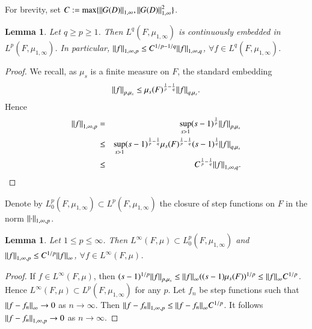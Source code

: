 \documentclass[final,1p]{elsarticle}
\numberwithin{equation}{section}
\theoremstyle{plain}
\newtheorem{lemma}[thm]{Lemma}
\theoremstyle{definition}
\begin{document}
For brevity, set $C := \max \{ {\mbox{\ensuremath{\| {G(D)} \|}}}_{1,\infty} ,  {\mbox{\ensuremath{\| {G(D)} \|}}}_{1,\infty}^2 \}$.

\begin{lemma} \label{lemma:cont_embed}
Let $q \geq p \geq 1$.  Then $L^q(F,\mu_{1,\infty})$ is continuously embedded in $L^p(F,\mu_{1,\infty})$.
In particular, ${\mbox{\ensuremath{\| {f} \|}}}_{1,\infty,p} \leq C^{1/p - 1/q} {\mbox{\ensuremath{\| {f} \|}}}_{1,\infty,q}$, ${\ensuremath{\forall}} f \in L^q(F,\mu_{1,\infty})$.
\end{lemma}
\begin{proof}
We recall, as $\mu_s$ is a finite measure on $F$, the standard embedding
$$
{\mbox{\ensuremath{\| {f} \|}}}_{p,\mu_s} \leq \mu_s(F)^{\frac 1p - \frac 1q} {\mbox{\ensuremath{\| {f} \|}}}_{q,\mu_s} .
$$
Hence
\begin{eqnarray*}
{\mbox{\ensuremath{\| {f} \|}}}_{1,\infty,p} & = & \sup_{s > 1} (s-1)^{ \frac 1p } {\mbox{\ensuremath{\| {f} \|}}}_{p,\mu_s} \\
& \leq & \sup_{s > 1} (s-1)^{\frac 1p - \frac 1q} \mu_s(F)^{\frac 1p - \frac 1q} (s-1)^{\frac 1q} {\mbox{\ensuremath{\| {f} \|}}}_{q,\mu_s} \\
& \leq & C^{\frac 1p - \frac 1q} {\mbox{\ensuremath{\| {f} \|}}}_{1,\infty,q} .
\end{eqnarray*}
\end{proof}

Denote by $L^p_0(F,\mu_{1,\infty}) \subset L^p(F,\mu_{1,\infty})$ the closure
of step functions on $F$ in the norm ${\mbox{\ensuremath{\| {\cdot} \|}}}_{1,\infty,p}$.

\begin{lemma}
Let $1 \leq p \leq \infty$.  Then $L^\infty(F,\mu) \subset L_0^p(F,\mu_{1,\infty})$ and ${\mbox{\ensuremath{\| {f} \|}}}_{1,\infty,p} \leq C^{1/p} {\mbox{\ensuremath{\| {f} \|}}}_\infty$, ${\ensuremath{\forall}} f \in L^\infty(F,\mu)$.
\end{lemma}
\begin{proof}
If $f \in L^\infty(F,\mu)$, then $(s-1)^{1/p}{\mbox{\ensuremath{\| {f} \|}}}_{p,\mu_s} \leq {\mbox{\ensuremath{\| {f} \|}}}_\infty ((s-1)\mu_s(F))^{1/p} \leq {\mbox{\ensuremath{\| {f} \|}}}_\infty C^{1/p}$.  Hence $L^\infty(F,\mu) \subset L^p(F,\mu_{1,\infty})$ for any $p$.  Let $f_n$ be step functions such that
${\mbox{\ensuremath{\| {f - f_n} \|}}}_\infty \to 0$ as $n \to \infty$.  Then 
${\mbox{\ensuremath{\| {f-f_n} \|}}}_{1,\infty,p} \leq {\mbox{\ensuremath{\| {f-f_n} \|}}}_\infty C^{1/p}$. It follows ${\mbox{\ensuremath{\| {f-f_n} \|}}}_{1,\infty,p} \to 0$ as $n \to \infty$.
\end{proof} 
\end{document}
